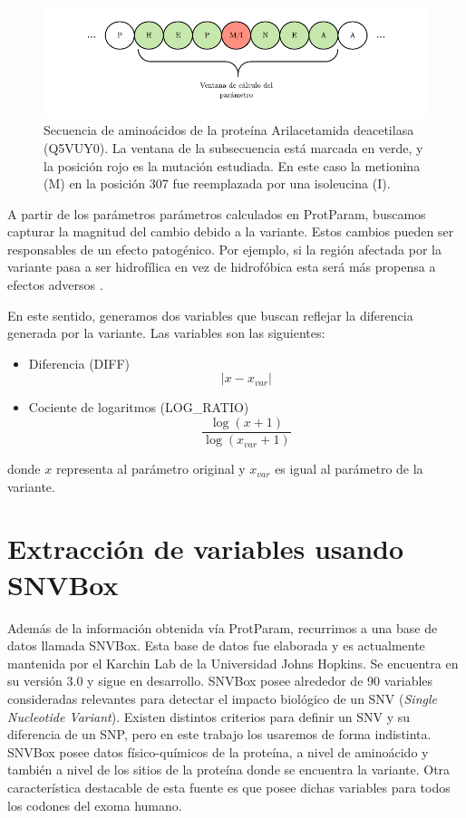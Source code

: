 \begin{figure}[H]
    \centering
    \includegraphics[scale=1.2]{documents/latex/figures/3/structural/protparam.pdf}
    \caption{Secuencia de aminoácidos de la proteína Arilacetamida deacetilasa (Q5VUY0). La ventana de la subsecuencia está marcada en verde, y la posición rojo es la mutación estudiada. En este caso la metionina (M) en la posición 307 fue reemplazada por una isoleucina (I).}
    \label{fig:sequence_window}
\end{figure}

A partir de los parámetros parámetros calculados en ProtParam, buscamos capturar la magnitud del cambio debido a la variante. Estos cambios pueden ser responsables de un efecto patogénico. Por ejemplo, si la región afectada por la variante pasa a ser hidrofílica en vez de hidrofóbica esta será más propensa a efectos adversos \cite{doi:10.1093/bioinformatics/btt308}.

En este sentido, generamos dos variables que buscan reflejar la diferencia generada por la variante. Las variables son las siguientes: 

\begin{itemize}
    \item Diferencia (DIFF) 
    $$|x - x_{var}|$$
    \item Cociente de logaritmos (LOG\_RATIO)
    $$\frac{\log{(x + 1)}}{\log{(x_{var} + 1)}}$$  
\end{itemize}

donde $x$ representa al parámetro original y $x_{var}$ es igual al parámetro de la variante.

\section{Extracción de variables usando SNVBox}

Además de la información obtenida vía ProtParam, recurrimos a una base de datos llamada SNVBox. Esta base de datos fue elaborada y es actualmente mantenida por el Karchin Lab de la Universidad Johns Hopkins. Se encuentra en su versión 3.0 y sigue en desarrollo. SNVBox posee alrededor de 90 variables consideradas relevantes para detectar el impacto biológico de un SNV (\textit{Single Nucleotide Variant}). Existen distintos criterios para definir un SNV y su diferencia de un SNP, pero en este trabajo los usaremos de forma indistinta. SNVBox posee datos físico-químicos de la proteína, a nivel de aminoácido y también a nivel de los sitios de la proteína donde se encuentra la variante. Otra característica destacable de esta fuente es que posee dichas variables para todos los codones del exoma humano.

